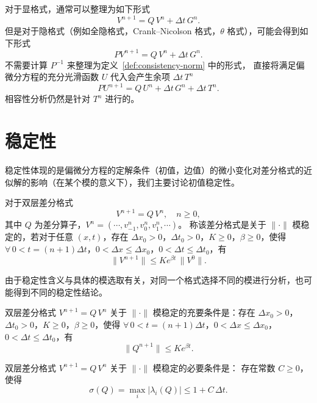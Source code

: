 \begin{remark}
    对于显格式，通常可以整理为如下形式
    \[
        V^{n+1} = Q \, V^{n} + \Delta t\, G^{n}.
    \]
    但是对于隐格式（例如全隐格式，Crank–Nicolson 格式，$\theta$ 格式），可能会得到如下形式
    \[
        P V^{n+1} = Q \, V^{n} + \Delta t\, G^{n}.
    \]
    不需要计算 $P^{-1}$ 来整理为定义~\ref{def:consistency-norm} 中的形式，
    直接将满足偏微分方程的充分光滑函数 $U$ 代入会产生余项 $\Delta t\,T^{n}$
    \[
        P U^{n+1} = Q \, U^{n} + \Delta t\, G^{n} + \Delta t\, T^{n}.
    \]
    相容性分析仍然是针对 $T^{n}$ 进行的。
\end{remark}

\section{稳定性}

稳定性体现的是偏微分方程的定解条件（初值，边值）的微小变化对差分格式的近似解的影响（在某个模的意义下），我们主要讨论初值稳定性。

\begin{definition}[稳定性]
    对于双层差分格式
    \[
        V^{n+1} = Q \, V^n,\quad n \ge 0,
    \]
    其中 $Q$ 为差分算子，$V^n = (\cdots,v_{-1}^n,v_0^n,v_1^n,\cdots)$。
    称该差分格式是关于 $\| \cdot \|$ 模稳定的，若对于任意 $(x,t)$，存在 $\Delta x_0 >0$，$\Delta t_0 > 0$，$K \ge 0$，$\beta \ge 0$，使得
    $\forall\, 0 < t = (n+1)\Delta t$，$0 < \Delta x \le \Delta x_0$，$0 < \Delta t \le \Delta t_0$，有
    \[
        \| V^{n+1} \| \le K e^{\beta t}\,\| V^0 \|.
    \]
\end{definition}

\begin{remark}
    由于稳定性含义与具体的模选取有关，对同一个格式选择不同的模进行分析，也可能得到不同的稳定性结论。
\end{remark}

\begin{theorem}
    双层差分格式 $V^{n+1} = Q \, V^n$ 关于 $\| \cdot \|$ 模稳定的充要条件是：存在 $\Delta x_0 >0$，$\Delta t_0 > 0$，$K \ge 0$，$\beta \ge 0$，使得
    $\forall\, 0 < t = (n+1)\Delta t$，$0 < \Delta x \le \Delta x_0$，$0 < \Delta t \le \Delta t_0$，有
    \[
        \| Q^{n+1} \| \le K e^{\beta t}.
    \]
\end{theorem}

\begin{theorem}
    双层差分格式 $V^{n+1} = Q \, V^n$ 关于 $\|\cdot\|$ 模稳定的必要条件是：
    存在常数 $C \ge 0$，使得
    \[
        \sigma(Q) = \max_i|\lambda_i(Q)| \le 1 + C\,\Delta t.
    \]
\end{theorem}

